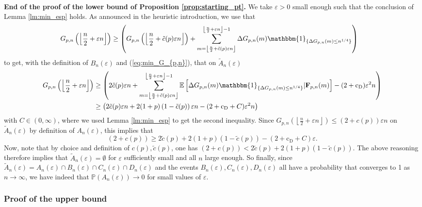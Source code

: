 \documentclass[a4, 11pt]{article}
\numberwithin{equation}{section}
\theoremstyle{plain}
\theoremstyle{definition}
\theoremstyle{remark}
\begin{document}
\textbf{End of the proof of the lower bound of Proposition \ref{prop:starting_pt}.}  We take $\varepsilon>0$ small enough such that the conclusion of Lemma \ref{lm:min_esp} holds.
As announced in the heuristic introduction, we use that
\begin{align*}
		G_{p,n}\left(\left\lfloor\frac{n}{2}+\varepsilon n\right\rfloor\right)&\geq \left(G_{p,n}\left(\left\lfloor\frac{n}{2}+\tilde{c}(p)\varepsilon n\right\rfloor\right)+ \sum_{m=\left\lfloor\frac{n}{2}+\tilde{c}(p)\varepsilon n\right\rfloor}^{\left\lfloor\frac{n}{2}+\varepsilon n\right\rfloor-1}\Delta G_{p,n}(m)\mathbbm{1}_{\{\Delta G_{p,n}(m)\leq n^{1/4}\}} \right)
	\end{align*}
to get, with the definition of $B_n(\varepsilon)$ and (\ref{eq:min_G_{p,n}}), that on $\tilde{A}_n(\varepsilon)$
	\begin{align*}
		G_{p,n}\left(\left\lfloor\frac{n}{2}+\varepsilon n\right\rfloor\right) &\geq \left(2\tilde{c}(p)\varepsilon n +\sum_{m=\left\lfloor\frac{n}{2}+\tilde{c}(p)\varepsilon n\right\rfloor }^{\left\lfloor\frac{n}{2}+\varepsilon n\right\rfloor-1}\mathbb{E}\left[\Delta G_{p,n}(m)\mathbbm{1}_{\{\Delta G_{p,n}(m)\leq n^{1/4}\}}\vert \mathbf{F}_{p,n}(m)   \right]-(2+\mathrm{c_D})\varepsilon^2n    \right) \\
		&\geq  \left(2\tilde{c}(p)\varepsilon n +2(1+p)\left(1-\tilde{c}(p)\right)\varepsilon n -(2+\mathrm{c_D}+C)\varepsilon^2n    \right)
	\end{align*}
with $C \in (0,\infty)$, where we used Lemma \ref{lm:min_esp} to get the second inequality.
Since $G_{p,n}\left(\left\lfloor\frac{n}{2}+\varepsilon n\right\rfloor\right) \leq (2+c(p))\varepsilon n$ on $\tilde{A}_n(\varepsilon)$ by definition of ${A}_n(\varepsilon)$, this implies that 
	$$(2+c(p)) \geq  2\tilde{c}(p)  +2(1+p)\left(1-\tilde{c}(p)\right)  -(2+\mathrm{c_D}+C)\varepsilon.$$
Now, note that by choice and definition of $c(p),\tilde c(p)$, one has $(2+c(p))<2\tilde{c}(p)  +2(1+p)(1-\tilde{c}(p))$. The above reasoning therefore  implies that $\tilde{A}_n(\varepsilon)=\emptyset$ for $\varepsilon$ sufficiently small and all  $n$ large enough. So finally, since $\tilde{A}_n(\varepsilon)=A_n(\varepsilon)\cap B_n(\varepsilon)\cap C_n(\varepsilon)\cap D_n(\varepsilon)$ and the events $B_n(\varepsilon), C_n(\varepsilon), D_n(\varepsilon)$ all have a probability that converges to 1 as $n \rightarrow \infty$, we have indeed that $\mathbb P(A_n(\varepsilon)) \rightarrow 0$ for small values of $\varepsilon$.
  	
	\subsubsection{Proof of the upper bound}
	
\end{document}
